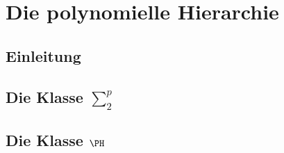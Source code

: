\section{Die polynomielle Hierarchie}
\subsection{Einleitung}

\subsection{Die Klasse $\sum_{2}^{p} $}

\subsection{Die Klasse $\PH$}

